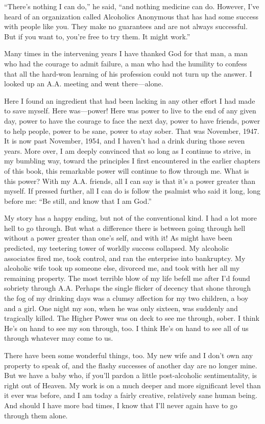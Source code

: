 \begin{biblechapter}
“There’s nothing I can do,” he said, “and nothing medicine can do. However, I’ve heard of an organization called Alcoholics Anonymous that has had some success with people like you. They make no guarantees and are not always successful. But if you want to, you’re free to try them. It might work.”

Many times in the intervening years I have thanked God for that man, a man who had the courage to admit failure, a man who had the humility to confess that all the hard-won learning of his profession could not turn up the answer. I looked up an A.A. meeting and went there—alone.

Here I found an ingredient that had been lacking in any other effort I had made to save myself. Here was—power! Here was power to live to the end of any given day, power to have the courage to face the next day, power to have friends, power to help people, power to be sane, power to stay sober. That was November, 1947. It is now past November, 1954, and I haven’t had a drink during those seven years. More over, I am deeply convinced that so long as I continue to strive, in my bumbling way, toward the principles I first encountered in the earlier chapters of this book, this remarkable power will continue to flow through me. What is this power? With my A.A. friends, all I can say is that it’s a power greater than myself. If pressed further, all I can do is follow the psalmist who said it long, long before me: “Be still, and know that I am God.”

My story has a happy ending, but not of the conventional kind. I had a lot more hell to go through. But what a difference there is between going through hell without a power greater than one’s self, and with it! As might have been predicted, my teetering tower of worldly success collapsed. My alcoholic associates fired me, took control, and ran the enterprise into bankruptcy. My alcoholic wife took up someone else, divorced me, and took with her all my remaining property. The most terrible blow of my life befell me after I’d found sobriety through A.A. Perhaps the single flicker of decency that shone through the fog of my drinking days was a clumsy affection for my two children, a boy and a girl. One night my son, when he was only sixteen, was suddenly and tragically killed. The Higher Power was on deck to see me through, sober. I think He’s on hand to see my son through, too. I think He’s on hand to see all of us through whatever may come to us.

\verse There have been some wonderful things, too.
\verse My new wife and I don’t own any property to speak of, 
    and the flashy successes of another day are no longer mine.
\verse But we have a baby who, 
    if you’ll pardon a little post-alcoholic sentimentality, 
    is right out of Heaven.
\verse My work is on a much deeper and more significant level 
    than it ever was before, 
    and I am today a fairly creative, relatively sane human being.
\verse And should I have more bad times, 
    I know that I’ll never again have to go through them alone.
\end{biblechapter}
